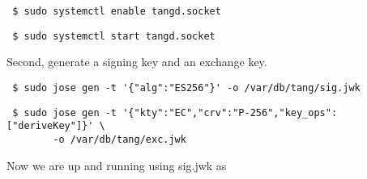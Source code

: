 \documentclass[../xdudla00-porting-Tang-to-Open-WRT.tex]{subfiles}
\begin{document}
{\tt\begin{verbatim} $ sudo systemctl enable tangd.socket\end{verbatim}
}

{\tt\begin{verbatim} $ sudo systemctl start tangd.socket\end{verbatim}
}

Second, generate a signing key and an exchange key.

{\tt\begin{verbatim} $ sudo jose gen -t '{"alg":"ES256"}' -o /var/db/tang/sig.jwk\end{verbatim}
}

{\tt\begin{verbatim} $ sudo jose gen -t '{"kty":"EC","crv":"P-256","key_ops":["deriveKey"]}' \
        -o /var/db/tang/exc.jwk\end{verbatim}
}

Now we are up and running using sig.jwk as 
\end{document}
